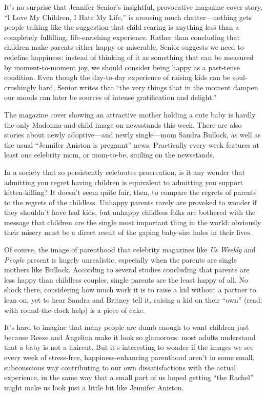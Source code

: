 It's no surprise that Jennifer Senior's insightful, provocative magazine
cover story, ``I Love My Children, I Hate My Life,'' is arousing much
chatter---nothing gets people talking like the suggestion that child
rearing is anything less than a completely fulfilling, life-enriching
experience. Rather than concluding that children make parents either
happy or miserable, Senior suggests we need to redefine happiness:
instead of thinking of it as something that can be measured by
moment-to-moment joy, we should consider being happy as a past-tense
condition. Even though the day-to-day experience of raising kids can be
soul-crushingly hard, Senior writes that ``the very things that in the
moment dampen our moods can later be sources of intense gratification
and delight.''

The magazine cover showing an attractive mother holding a cute baby is
hardly the only Madonna-and-child image on newsstands this week. There
are also stories about newly adoptive---and newly single---mom Sandra
Bullock, as well as the usual ``Jennifer Aniston is pregnant'' news.
Practically every week features at least one celebrity mom, or
mom-to-be, smiling on the newsstands.

In a society that so persistently celebrates procreation, is it any
wonder that admitting you regret having children is equivalent to
admitting you support kitten-killing? It doesn't seem quite fair, then,
to compare the regrets of parents to the regrets of the childless.
Unhappy parents rarely are provoked to wonder if they shouldn't have had
kids, but unhappy childless folks are bothered with the message that
children are the single most important thing in the world: obviously
their misery must be a direct result of the gaping baby-size holes in
their lives.

Of course, the image of parenthood that celebrity magazines
like \emph{Us Weekly} and \emph{People} present is hugely unrealistic,
especially when the parents are single mothers like Bullock. According
to several studies concluding that parents are less happy than childless
couples, single parents are the least happy of all. No shock there,
considering how much work it is to raise a kid without a partner to lean
on; yet to hear Sandra and Britney tell it, raising a kid on their
``own'' (read: with round-the-clock help) is a piece of cake.

It's hard to imagine that many people are dumb enough to want children
just because Reese and Angelina make it look so glamorous: most adults
understand that a baby is not a haircut. But it's interesting to wonder
if the images we see every week of stress-free, happiness-enhancing
parenthood aren't in some small, subconscious way contributing to our
own dissatisfactions with the actual experience, in the same way that a
small part of us hoped getting ``the Rachel'' might make us look just a
little bit like Jennifer Aniston.

